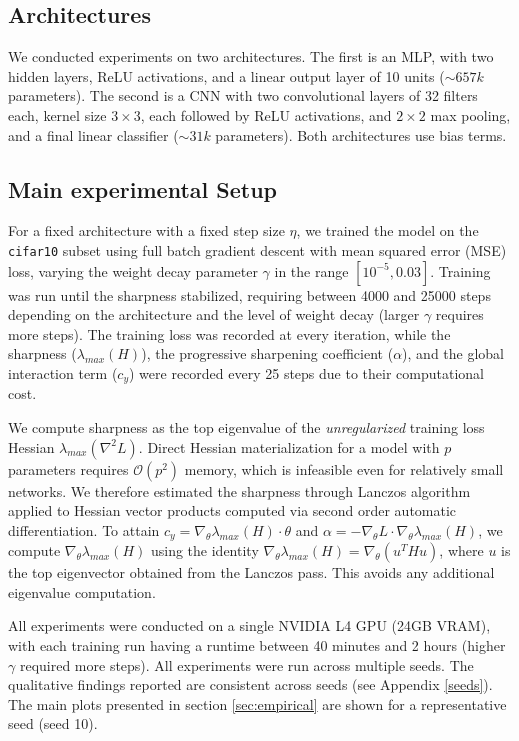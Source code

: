 \documentclass{article}
\begin{document}
\subsection{Architectures}
We conducted experiments on two architectures. The first is an MLP, with two hidden layers, ReLU activations, and a linear output layer of 10 units ($\sim 657k$ parameters). The second is a CNN with two convolutional layers of 32 filters each, kernel size $3\times 3$, each followed by ReLU activations, and $2\times2$ max pooling, and a final linear classifier ($\sim 31k$ parameters). Both architectures use bias terms. 

\subsection{Main experimental Setup}
For a fixed architecture with a fixed step size $\eta$, we trained the model on the \texttt{cifar10} subset using full batch gradient descent with mean squared error (MSE) loss, varying the weight decay parameter $\gamma$ in the range $[10^{-5},0.03]$. Training was run until the sharpness stabilized, requiring between 4000 and 25000 steps depending on the architecture and the level of weight decay (larger $\gamma$ requires more steps). The training loss was recorded at every iteration, while the sharpness ($\lambda_{max}(H)$), the progressive sharpening coefficient ($\alpha$), and the global interaction term ($c_y$) were recorded every 25 steps due to their computational cost. 

We compute sharpness as the top eigenvalue of the \emph{unregularized} training loss Hessian $\lambda_{max}(\nabla^2 L)$. Direct Hessian materialization for a model with $p$ parameters requires $\mathcal{O}(p^2)$ memory, which is infeasible even for relatively small networks. We therefore estimated the sharpness through Lanczos algorithm applied to Hessian vector products computed via second order automatic differentiation. To attain $c_y=\nabla_{\theta} \lambda_{max}(H)\cdot\theta$ and $\alpha=-\nabla_\theta L\cdot\nabla_{\theta} \lambda_{max}(H)$, we compute $\nabla_{\theta} \lambda_{max}(H)$ using the identity $\nabla_{\theta} \lambda_{max}(H)=\nabla_{\theta}(u^THu)$, where $u$ is the top eigenvector obtained from the Lanczos pass. This avoids any additional eigenvalue computation. 

All experiments were conducted on a single NVIDIA L4 GPU (24GB VRAM), with each training run having a runtime between 40 minutes and 2 hours (higher $\gamma$ required more steps). All experiments were run across multiple seeds. The qualitative findings reported are consistent across seeds (see Appendix \ref{seeds}). The main plots presented in section \ref{sec:empirical} are shown for a representative seed (seed 10). 
\end{document}
